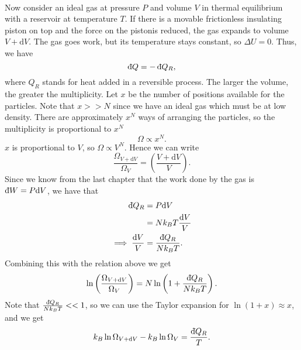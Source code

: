 \documentclass[../thermodynamics.tex]{subfiles}
\begin{document}
        \paragraph{}
        Now consider an ideal gas at pressure $P$ and volume $V$ in thermal equilibrium with a reservoir at temperature $T$.
        If there is a movable frictionless insulating piston on top and the force on the pistonis reduced, the gas expands to volume $V+\mathrm{d}V$.
        The gas goes work, but its temperature stays constant, so $\Delta U=0$.
        Thus, we have
        \begin{equation}
            \dbar{Q}=-\dbar{Q}_R,
        \end{equation}
        where $Q_R$ stands for heat added in a reversible process.
        The larger the volume, the greater the multiplicity.
        Let $x$ be the number of positions available for the particles.
        Note that $x>>N$ since we have an ideal gas which must be at low density.
        There are approximately $x^N$ ways of arranging the particles, so the multiplicity is proportional to $x^N$
        \begin{equation}
            \Omega\propto x^N.
        \end{equation}
        $x$ is proportional to $V$, so $\Omega\propto V^N$.
        Hence we can write
        \begin{equation}
            \frac{\Omega_{V+\mathrm{d}V}}{\Omega_V}=\left(\frac{V+\mathrm{d}V}{V}\right).
        \end{equation}
        Since we know from the last chapter that the work done by the gas is $\dbar{W}=P\mathrm{d}V$, we have that
        \begin{align}
            \dbar{Q}_R&=P\mathrm{d}V\\
            &=Nk_BT\frac{\mathrm{d}V}{V}\\
            \implies\frac{\mathrm{d}{V}}{V}&=\frac{\dbar{Q}_R}{Nk_BT}.
        \end{align}
        Combining this with the relation above we get
        \begin{equation}
            \ln\left(\frac{\Omega_{V+\mathrm{d}V}}{\Omega_V}\right)=N\ln\left(1+\frac{\dbar{Q}_R}{Nk_BT}\right).
        \end{equation}
        Note that $\frac{\dbar{Q}_R}{Nk_BT}<<1$, so we can use the Taylor expansion for $\ln(1+x)\approx x$, and we get
        \begin{equation}
            k_B\ln\Omega_{V+\mathrm{d}V}-k_B\ln\Omega_V=\frac{\dbar{Q}_R}{T}.
        \end{equation}
\end{document}
